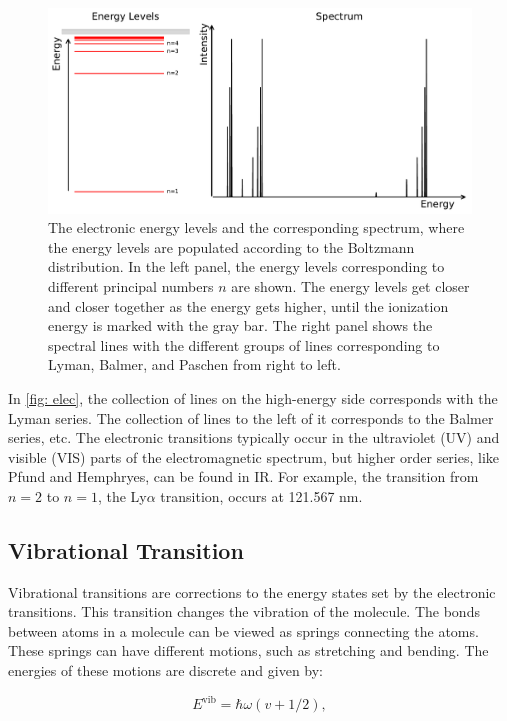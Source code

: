 \documentclass[oneside, single, authoryear, semicolon, 12pt]{lion-msc}
\newcommand{\4}{$_4$}
\newcommand{\3}{$_3$}
\newcommand{\2}{$_2$}
\begin{document}
\begin{figure}[H]
    \centering
    \includegraphics[width=\linewidth]{Figures/ElecSpectrum.pdf}
    \caption{The electronic energy levels and the corresponding spectrum, where the energy levels are populated according to the Boltzmann distribution. In the left panel, the energy levels corresponding to different principal numbers $n$ are shown. The energy levels get closer and closer together as the energy gets higher, until the ionization energy is marked with the gray bar. The right panel shows the spectral lines with the different groups of lines corresponding to Lyman, Balmer, and Paschen from right to left.}
    \label{fig: elec}
\end{figure}

In \autoref{fig: elec}, the collection of lines on the high-energy side corresponds with the Lyman series. The collection of lines to the left of it corresponds to the Balmer series, etc.
The electronic transitions typically occur in the ultraviolet (UV) and visible (VIS) parts of the electromagnetic spectrum, but higher order series, like Pfund and Hemphryes, can be found in IR. For example, the transition from $n=2$ to $n=1$, the Ly$\alpha$ transition, occurs at 121.567 nm.


\subsection{Vibrational Transition}
Vibrational transitions are corrections to the energy states set by the electronic transitions. This transition changes the vibration of the molecule. 
The bonds between atoms in a molecule can be viewed as springs connecting the atoms. These springs can have different motions, such as stretching and bending. The energies of these motions are discrete and given by: 

\begin{equation}
    E^{\mathrm{vib}}=\hbar\omega(v+1/2),
\end{equation}
\end{document}
